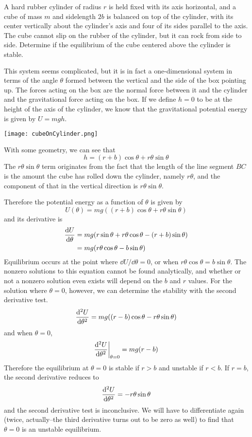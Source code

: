 \begin{example}
    
    \begin{minipage}{0.48\textwidth}
        A hard rubber cylinder of radius $r$ is held fixed with its axis horizontal, and a cube of mass $m$ and sidelength $2b$ is balanced on top of the cylinder, with its center vertically about the cylinder's axis and four of its sides parallel to the axis. The cube cannot slip on the rubber of the cylinder, but it can rock from side to side. Determine if the equilibrium of the cube centered above the cylinder is stable. 

        This system seems complicated, but it is in fact a one-dimensional system in terms of the angle $\theta$ formed between the vertical and the side of the box pointing up. The forces acting on the box are the normal force between it and the cylinder and the gravitational force acting on the box. If we define $h=0$ to be at the height of the axis of the cylinder, we know that the gravitational potential energy is given by $U = mgh$.
    \end{minipage}
    \begin{minipage}{0.48\textwidth}
        \parbox{\textwidth}{
            \texttt{[image: cubeOnCylinder.png]}
        }
    \end{minipage}
    
    With some geometry, we can see that
    \[ h = (r+b)\cos\theta + r\theta\sin\theta \]
    The $r\theta\sin\theta$ term originates from the fact that the length of the line segment $BC$ is the amount the cube has rolled down the cylinder, namely $r\theta$, and the component of that in the vertical direction is $r\theta\sin\theta$.

    Therefore the potential energy as a function of $\theta$ is given by
    \[ U(\theta) = mg((r+b)\cos\theta + r\theta\sin\theta) \]
    and its derivative is 
    \begin{align*}
        \dv{U}{\theta} &= mg(r\sin\theta + r\theta\cos\theta - (r+b)\sin\theta) \\
        &= mg(r\theta\cos\theta - b\sin\theta) 
    \end{align*}
    Equilibrium occurs at the point where $\dd U/\dd \theta = 0$, or when $r\theta\cos\theta = b\sin\theta$. The nonzero solutions to this equation cannot be found analytically, and whether or not a nonzero solution even exists will depend on the $b$ and $r$ values. For the solution where $\theta = 0$, however, we can determine the stability with the second derivative test.
    \begin{align*}
        \dv[2]{U}{\theta} = mg((r-b)\cos\theta - r\theta\sin\theta)
    \end{align*}
    and when $\theta =0$,
    \[ \dv[2]{U}{\theta}\biggr|_{\theta = 0} = mg(r-b)\]
    Therefore the equilibrium at $\theta = 0$ is stable if $r > b$ and unstable if $r < b$. If $r=b$, the second derivative reduces to
    \[ \dv[2]{U}{\theta} = -r\theta\sin\theta\]
    and the second derivative test is inconclusive. We will have to differentiate again (twice, actually--the third derivative turns out to be zero as well) to find that $\theta = 0$ is an unstable equilibrium. 
\end{example}
